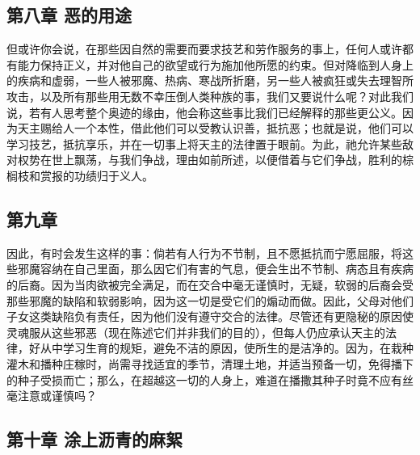 
\subsection{第八章 恶的用途}

但或许你会说，在那些因自然的需要而要求技艺和劳作服务的事上，任何人或许都有能力保持正义，并对他自己的欲望或行为施加他所愿的约束。但对降临到人身上的疾病和虚弱，一些人被邪魔、热病、寒战所折磨，另一些人被疯狂或失去理智所攻击，以及所有那些用无数不幸压倒人类种族的事，我们又要说什么呢？对此我们说，若有人思考整个奥迹的缘由，他会称这些事比我们已经解释的那些更公义。因为天主赐给人一个本性，借此他们可以受教认识善，抵抗恶；也就是说，他们可以学习技艺，抵抗享乐，并在一切事上将天主的法律置于眼前。为此，祂允许某些敌对权势在世上飘荡，与我们争战，理由如前所述，以便借着与它们争战，胜利的棕榈枝和赏报的功绩归于义人。\par


\subsection{第九章 }

因此，有时会发生这样的事：倘若有人行为不节制，且不愿抵抗而宁愿屈服，将这些邪魔容纳在自己里面，那么因它们有害的气息，便会生出不节制、病态且有疾病的后裔。因为当肉欲被完全满足，而在交合中毫无谨慎时，无疑，软弱的后裔会受那些邪魔的缺陷和软弱影响，因为这一切是受它们的煽动而做。因此，父母对他们子女这类缺陷负有责任，因为他们没有遵守交合的法律。尽管还有更隐秘的原因使灵魂服从这些邪恶（现在陈述它们并非我们的目的），但每人仍应承认天主的法律，好从中学习生育的规矩，避免不洁的原因，使所生的是洁净的。因为，在栽种灌木和播种庄稼时，尚需寻找适宜的季节，清理土地，并适当预备一切，免得播下的种子受损而亡；那么，在超越这一切的人身上，难道在播撒其种子时竟不应有丝毫注意或谨慎吗？\par


\subsection{第十章 涂上沥青的麻絮}

